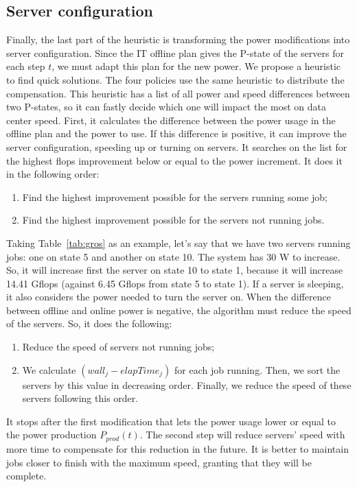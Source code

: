 \subsection{Server configuration}
\label{sec:server_configuration}

Finally, the last part of the heuristic is transforming the power modifications into server configuration. Since the IT offline plan gives the P-state of the servers for each step $t$, we must adapt this plan for the new power. We propose a heuristic to find quick solutions. The four policies use the same heuristic to distribute the compensation. This heuristic has a list of all power and speed differences between two P-states, so it can fastly decide which one will impact the most on data center speed. First, it calculates the difference between the power usage in the offline plan and the power to use. If this difference is positive, it can improve the server configuration, speeding up or turning on servers. It searches on the list for the highest flops improvement below or equal to the power increment. It does it in the following order:
\begin{enumerate}
    \item Find the highest improvement possible for the servers running some job;
    \item Find the highest improvement possible for the servers not running jobs.
\end{enumerate}

Taking Table~\ref{tab:gros} as an example, let's say that we have two servers running jobs: one on state 5 and another on state 10. The system has 30 W to increase. So, it will increase first the server on state 10 to state 1, because it will increase 14.41 Gflops (against 6.45 Gflops from state 5 to state 1). If a server is sleeping, it also considers the power needed to turn the server on. When the difference between offline and online power is negative, the algorithm must reduce the speed of the servers. So, it does the following:
\begin{enumerate}
    \item Reduce the speed of servers not running jobs;
    \item We calculate $(wall_{j} - elapTime_{j})$ for each job running. Then, we sort the servers by this value in decreasing order. Finally, we reduce the speed of these servers following this order. 
\end{enumerate}

It stops after the first modification that lets the power usage lower or equal to the power production $P_{prod}(t)$. The second step will reduce servers' speed with more time to compensate for this reduction in the future. It is better to maintain jobs closer to finish with the maximum speed, granting that they will be complete.

